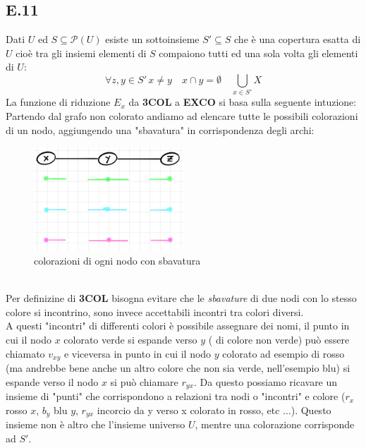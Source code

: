 \documentclass[a4paper]{article}
\begin{document}
\subsection{E.11}
Dati $U$ ed $S \subseteq \mathcal{P}(U)$ esiste un sottoinsieme $S' \subseteq S$ che è una copertura esatta di $U$ cioè tra gli insiemi elementi di $S$ compaiono tutti ed una sola volta gli elementi di $U$:
$$\forall z,y \in S'\, x \neq y \quad x \cap y = \emptyset \quad \bigcup_{x \in S'}X $$
La funzione di riduzione $E_x$ da \textbf{3COL} a \textbf{EXCO} si basa sulla seguente intuzione:\\
Partendo dal grafo non colorato andiamo ad elencare tutte le possibili colorazioni di un nodo, aggiungendo una "sbavatura" in corrispondenza degli archi:
\begin{figure}[!ht]
                \centering
                \includegraphics[width = 0.5\textwidth]{./img/E11_sbavatura.png}
                \caption{colorazioni di ogni nodo con sbavatura} \label{FIG:E11_sbavatura}
\end{figure}\\
Per definizine di \textbf{3COL} bisogna evitare che le \textit{sbavature} di due nodi con lo stesso colore si incontrino, sono invece accettabili incontri tra colori diversi.\\
A questi "incontri" di differenti colori è possibile assegnare dei nomi, il punto in cui il nodo $x$ colorato verde si espande verso $y$ ( di colore non verde) può essere chiamato $v_{xy}$ e viceversa in punto in cui il nodo $y$ colorato ad esempio di rosso (ma andrebbe bene anche un altro colore che non sia verde, nell'esempio blu) si espande verso il nodo $x$ si può chiamare $r_{yx}$.
Da questo possiamo ricavare un insieme di "punti" che corrispondono a relazioni tra nodi o "incontri" e colore ($r_x$ rosso $x$, $b_y$ blu $y$, $r_{yx}$ incorcio da y verso x colorato in rosso, etc ...).
Questo insieme non è altro che l'insieme universo $U$, mentre una colorazione corrisponde ad $S'$.
\end{document}
